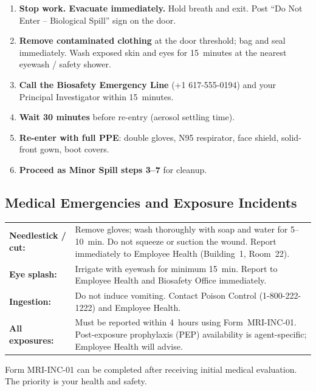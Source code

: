 \begin{procedurebox}
\begin{enumerate}[leftmargin=1.6em, itemsep=3pt,
                  label=\textbf{\color{BSLmid}\arabic*.}]
  \item \textbf{Stop work. Evacuate immediately.} Hold breath and exit. Post
        ``Do Not Enter -- Biological Spill'' sign on the door.
  \item \textbf{Remove contaminated clothing} at the door threshold; bag and seal
        immediately. Wash exposed skin and eyes for 15~minutes at the nearest
        eyewash / safety shower.
  \item \textbf{Call the Biosafety Emergency Line} (+1 617-555-0194) and your
        Principal Investigator within 15~minutes.
  \item \textbf{Wait 30 minutes} before re-entry (aerosol settling time).
  \item \textbf{Re-enter with full PPE}: double gloves, N95 respirator, face
        shield, solid-front gown, boot covers.
  \item \textbf{Proceed as Minor Spill steps 3--7} for cleanup.
\end{enumerate}
\end{procedurebox}

\subsection{Medical Emergencies and Exposure Incidents}

\begin{infobox}
\small
\begin{tabular}{@{}L{3.2cm} L{10cm}@{}}
\textbf{Needlestick / cut:} & Remove gloves; wash thoroughly with soap and water for
                               5--10~min. Do not squeeze or suction the wound. Report
                               immediately to Employee Health (Building~1, Room~22). \\[4pt]
\textbf{Eye splash:}         & Irrigate with eyewash for minimum 15~min. Report to
                               Employee Health and Biosafety Office immediately. \\[4pt]
\textbf{Ingestion:}          & Do not induce vomiting. Contact Poison Control
                               (1-800-222-1222) and Employee Health. \\[4pt]
\textbf{All exposures:}      & Must be reported within 4~hours using Form~MRI-INC-01.
                               Post-exposure prophylaxis (PEP) availability is agent-specific;
                               Employee Health will advise. \\
\end{tabular}
\end{infobox}

\begin{warningbox}
Form MRI-INC-01 can be completed after receiving initial medical evaluation.
The priority is your health and safety.
\end{warningbox}
